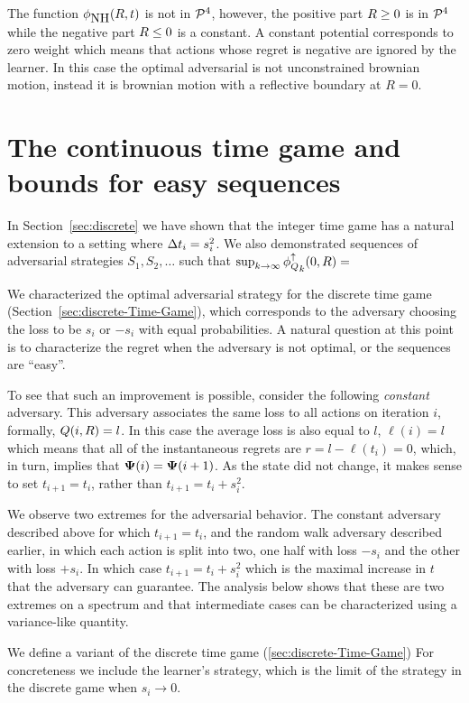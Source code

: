 \documentclass{article}[12pt]
\begin{document}
The function $\phi_{\mbox{NH}}(R,t)$ is not in ${\cal P}^{4}$, however, the
positive part $R\geq 0$ is in ${\cal P}^{4}$ while the negative part
$R \leq 0$ is a constant. A constant potential corresponds to zero weight which means that actions whose regret is negative are ignored by the learner. In this case the optimal adversarial is not unconstrained brownian motion, instead it is brownian motion with a reflective boundary at $R=0$.

\section{The continuous time game and bounds for easy
  sequences} \label{sec:easy}

In Section~\ref{sec:discrete} we have shown that the integer time game
has a natural extension to a setting where $\Delta t_i = s_i^2$. We
also demonstrated sequences of adversarial strategies $S_1,S_2,\ldots$
such that $\sup_{k \to \infty} {\phi_{Q}^{\uparrow}}_k(0,R) = $

We characterized the optimal adversarial strategy for the discrete
time game (Section~\ref{sec:discrete-Time-Game}), which corresponds
to the adversary choosing the loss to be $s_i$ or $-s_i$ with equal
probabilities. A natural question at this point is to characterize the
regret when the adversary is not optimal, or the sequences are ``easy''.

To see that such an improvement is possible, consider the following
{\em constant} adversary. This adversary associates the same loss to
all actions on iteration $i$, formally, $Q(i,R) = l$. In this
case the average loss is also equal to $l$, $\ell(i)=l$ which means
that all of the instantaneous regrets are $r=l-\ell(t_i) = 0$, which,
in turn, implies that ${\bf \Psi}(i) = {\bf \Psi}(i+1)$. As the state did not
change, it makes sense to set $t_{i+1}=t_i$, rather than
$t_{i+1}=t_i+s_i^2$.

We observe two extremes for the adversarial behavior. The constant
adversary described above for which $t_{i+1} = t_i$, and the random walk adversary described
earlier, in which each action is split into two, one half with loss
$-s_i$ and the other with loss $+s_i$. In which case $t_{i+1} =
t_i+s_i^2$ which is the maximal increase in $t$ that the adversary can
guarantee. The analysis below shows that these are two extremes on a
spectrum and that intermediate cases can be characterized using a
variance-like quantity.

We define a variant of the discrete time game
(\ref{sec:discrete-Time-Game}) For concreteness we include the
learner's strategy, which is the limit of the strategy in the discrete
game when $s_i \to 0$.
\end{document}
